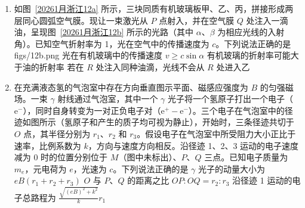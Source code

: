 \documentclass[\gkver]{gaokaozhenti}
\begin{document}
\begin{enumerate}
{D．通过提取海水中的氘和氚进行核反应属于轻核聚变，而秦山核电站利用重核裂变获取能量，故 D 错误。

故选 AB。
}

\item
如图~\ref{20261月浙江12a} 所示，三块同质有机玻璃板甲、乙、丙，拼接形成两层同心圆弧空气膜。现让一束激光从 $P$ 点射入，并在空气膜 $Q$ 处注入一滴油，呈现图~\ref{20261月浙江12b} 所示的光路（其中 $\alpha$、$\beta$ 为相应光线的入射角）。已知空气折射率为 1，光在空气中的传播速度为 $c$。下列说法正确的是 
{figs/12b.png}
{光在有机玻璃中的传播速度 $v \geq c\sin\alpha$}
{有机玻璃的折射率可能大于油的折射率}
{若在 $R$ 处注入同种油滴，光线不会从 $R$ 处进入乙}


\item
在充满液态氢的气泡室中存在方向垂直图示平面、磁感应强度为 $B$ 的匀强磁场。一束 $\gamma$ 射线通过气泡室，其中一个 $\gamma$ 光子将一个氢原子打出一个电子（$\mathrm{e}^{-}$），同时自身转变为一对正负电子对（$\mathrm{e}^{+}-\mathrm{e}^{-}$）。三个电子在气泡室中的径迹如图所示（氢原子和产生的质子均可视为静止），开始时，三条径迹共切于 $O$ 点，其半径分别为 $r_{1}$、$r_{2}$ 和 $r_{3}$。假设电子在气泡室中所受阻力大小正比于速率，比例系数为 $k$，方向与速度方向相反。沿径迹 1、2、3 运动的电子速度减为 0 时的位置分别位于 $M$（图中未标出）、$P$、$Q$ 三点。已知电子质量为 $m_{e}$，元电荷为 $e$，光速为 $c$。下列说法正确的是 
\onepicture[w=6.16cm]{}
{$\gamma$ 光子的动量大小为 $eB(r_{1} + r_{2} + r_{3})$}
{$O$ 与 $P$、$Q$ 的距离之比 $OP:OQ = r_{2}:r_{3}$}
{沿径迹 1 运动的电子总路程为 $\frac{\sqrt{(eB)^{2} + k^{2}}}{k}r_{1}$}


\end{enumerate}
\end{document}

